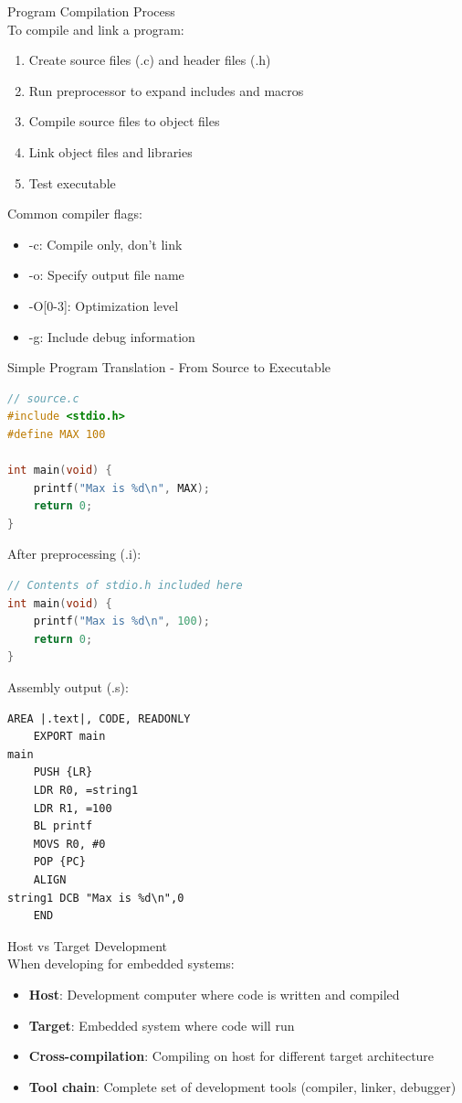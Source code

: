 \begin{KR}{Program Compilation Process}\\
To compile and link a program:
\begin{enumerate}
  \item Create source files (.c) and header files (.h)
  \item Run preprocessor to expand includes and macros
  \item Compile source files to object files
  \item Link object files and libraries
  \item Test executable
\end{enumerate}

Common compiler flags:
\begin{itemize}
  \item -c: Compile only, don't link
  \item -o: Specify output file name
  \item -O[0-3]: Optimization level
  \item -g: Include debug information
\end{itemize}
\end{KR}

\begin{code}{Simple Program Translation - From Source to Executable}
\begin{lstlisting}[language=C, style=base]
// source.c
#include <stdio.h>
#define MAX 100

int main(void) {
    printf("Max is %d\n", MAX);
    return 0;
}
\end{lstlisting}

After preprocessing (.i):
\begin{lstlisting}[language=C, style=base]
// Contents of stdio.h included here
int main(void) {
    printf("Max is %d\n", 100);
    return 0;
}
\end{lstlisting}

Assembly output (.s):
\begin{lstlisting}[language=armasm, style=base]
    AREA |.text|, CODE, READONLY
    EXPORT main
main
    PUSH {LR}
    LDR R0, =string1
    LDR R1, =100
    BL printf
    MOVS R0, #0
    POP {PC}
    ALIGN
string1 DCB "Max is %d\n",0
    END
\end{lstlisting}
\end{code}

\begin{example2}{Host vs Target Development}\\
When developing for embedded systems:
\begin{itemize}
  \item \textbf{Host}: Development computer where code is written and compiled
  \item \textbf{Target}: Embedded system where code will run
  \item \textbf{Cross-compilation}: Compiling on host for different target architecture
  \item \textbf{Tool chain}: Complete set of development tools (compiler, linker, debugger)
\end{itemize}
\end{example2}


